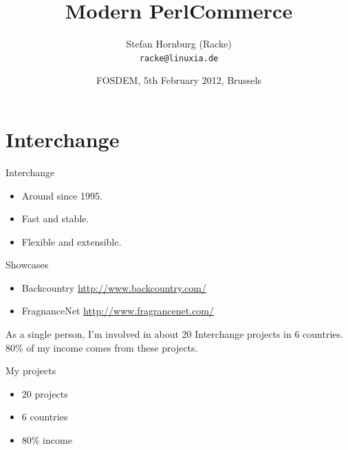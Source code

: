
\usepackage[T1]{fontenc}
\usepackage{mathptmx}
\usepackage[scaled=.90]{helvet}
\usepackage{courier}

\usepackage{beamerthemesplit}
\usepackage{verbatim}
\usepackage{hyperref}
\usepackage{listings}
\lstset{language=Perl,basicstyle=\footnotesize,tabsize=3,showstringspaces=false}


\title{Modern PerlCommerce}
\author[racke]{Stefan Hornburg (Racke)\\ \texttt{racke@linuxia.de}}
\date[]{FOSDEM, 5th February 2012, Brussels}


\maketitle{}

\begin{frame}
  \titlepage
\end{frame}

\tableofcontents

\section{Interchange}

\begin{frame}{Interchange}
\begin{itemize}
\item Around since 1995.
\item Fast and stable.
\item Flexible and extensible.
\end{itemize}
\end{frame}

\begin{frame}{Showcases}
\begin{itemize}
\item Backcountry \url{http://www.backcountry.com/}
\item FragnanceNet \url{http://www.fragrancenet.com/}
\end{itemize}
\end{frame}

As a single person, I'm involved in about 20 Interchange
projects in 6 countries. 80\% of my income comes from
these projects.

\begin{frame}{My projects}
\begin{itemize}
\item 20 projects
\item 6 countries
\item 80\% income
\end{itemize}
\end{frame}

